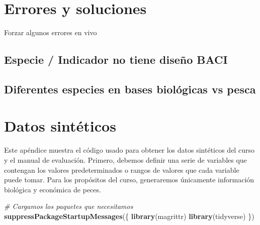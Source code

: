 \documentclass[]{krantz}
\newenvironment{Shaded}{\begin{snugshade}}{\end{snugshade}}
\newcommand{\CommentTok}[1]{\textcolor[rgb]{0.56,0.35,0.01}{\textit{#1}}}
\newcommand{\KeywordTok}[1]{\textcolor[rgb]{0.13,0.29,0.53}{\textbf{#1}}}
\newcommand{\NormalTok}[1]{#1}
\begin{document}
\hypertarget{errores-y-soluciones}{%
\chapter{Errores y soluciones}\label{errores-y-soluciones}}

Forzar algunos errores en vivo

\hypertarget{especie-indicador-no-tiene-diseno-baci}{%
\section{Especie / Indicador no tiene diseño
BACI}\label{especie-indicador-no-tiene-diseno-baci}}

\hypertarget{diferentes-especies-en-bases-biologicas-vs-pesca}{%
\section{Diferentes especies en bases biológicas vs
pesca}\label{diferentes-especies-en-bases-biologicas-vs-pesca}}

\hypertarget{appendix-appendice}{%
\appendix {}}


\hypertarget{datos-sinteticos}{%
\chapter{Datos sintéticos}\label{datos-sinteticos}}

Este apéndice muestra el código usado para obtener los datos sintéticos
del curso y el manual de evaluación. Primero, debemos definir una serie
de variables que contengan los valores predeterminados o rangos de
valores que cada variable puede tomar. Para los propósitos del curso,
generaremos únicamente información biológica y económica de peces.

\begin{Shaded}
\begin{Highlighting}[]
\CommentTok{# Cargamos los paquetes que necesitamos}
\KeywordTok{suppressPackageStartupMessages}\NormalTok{(\{}
  \KeywordTok{library}\NormalTok{(magrittr)}
  \KeywordTok{library}\NormalTok{(tidyverse)}
\NormalTok{\})}
\end{Highlighting}
\end{Shaded}
\end{document}
